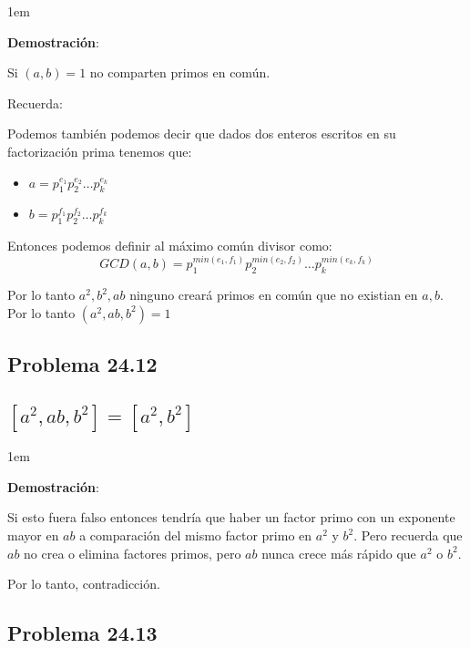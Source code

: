 \documentclass[12pt, fleqn]{article}                             %
\newenvironment{SmallIndentation}[1][0.75em]                    %
    {\begin{adjustwidth}{#1}{}\begin{footnotesize}}                 %
    {\end{footnotesize}\end{adjustwidth}}                           %
\begin{document}
    \begin{SmallIndentation}[1em]
        \textbf{Demostración}:
        
        Si $(a,b)=1$ no comparten primos en común.

        Recuerda:

        Podemos también podemos decir que dados dos enteros escritos en 
        su factorización prima tenemos que:
        \begin{itemize}
            \item $a = p_1^{e_1} p_2^{e_2} \dots p_k^{e_k}$
            \item $b = p_1^{f_1} p_2^{f_2} \dots p_k^{f_k}$
        \end{itemize}

        Entonces podemos definir al máximo común divisor como:
        \begin{equation}
            GCD(a, b) = p_1^{min(e_1, f_1)} p_2^{min(e_2, f_2)} \dots p_k^{min(e_k, f_k)}
        \end{equation}

        Por lo tanto $a^2, b^2, ab$ ninguno creará primos en común
        que no existian en $a, b$. Por lo tanto $(a^2, ab, b^2) = 1$

    \end{SmallIndentation}

    \subsection{Problema 24.12}
    \subsection*{$[a^2, ab, b^2] = [a^2, b^2]$}

    \begin{SmallIndentation}[1em]
        \textbf{Demostración}:
        
        Si esto fuera falso entonces tendría que haber un factor primo con un
        exponente mayor en $ab$ a comparación del mismo factor primo en $a^2$ y
        $b^2$. Pero recuerda que $ab$ no crea o elimina factores primos, pero
        $ab$ nunca crece más rápido que $a^2$ o $b^2$.

        Por lo tanto, contradicción.
    \end{SmallIndentation}


    \subsection{Problema 24.13}
\end{document}

